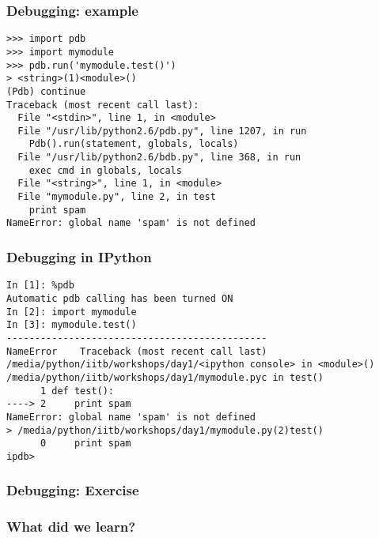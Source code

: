 \documentclass[14pt,compress]{beamer}
\begin{document}
\begin{frame}[fragile]
\frametitle{Debugging: example}
\small
\begin{lstlisting}
>>> import pdb
>>> import mymodule
>>> pdb.run('mymodule.test()')
> <string>(1)<module>()
(Pdb) continue
Traceback (most recent call last):
  File "<stdin>", line 1, in <module>
  File "/usr/lib/python2.6/pdb.py", line 1207, in run
    Pdb().run(statement, globals, locals)
  File "/usr/lib/python2.6/bdb.py", line 368, in run
    exec cmd in globals, locals
  File "<string>", line 1, in <module>
  File "mymodule.py", line 2, in test
    print spam
NameError: global name 'spam' is not defined
\end{lstlisting}
\end{frame}

\begin{frame}[fragile]
\frametitle{Debugging in IPython}
\small
\begin{lstlisting}
In [1]: %pdb
Automatic pdb calling has been turned ON
In [2]: import mymodule
In [3]: mymodule.test()
----------------------------------------------
NameError    Traceback (most recent call last)
/media/python/iitb/workshops/day1/<ipython console> in <module>()
/media/python/iitb/workshops/day1/mymodule.pyc in test()
      1 def test():
----> 2     print spam
NameError: global name 'spam' is not defined
> /media/python/iitb/workshops/day1/mymodule.py(2)test()
      0     print spam
ipdb>
\end{lstlisting}
\end{frame}

\begin{frame}[fragile]
\frametitle{Debugging: Exercise}
\end{frame}

\begin{frame}
  \frametitle{What did we learn?}
  \tableofcontents
\end{frame}
\end{document}
